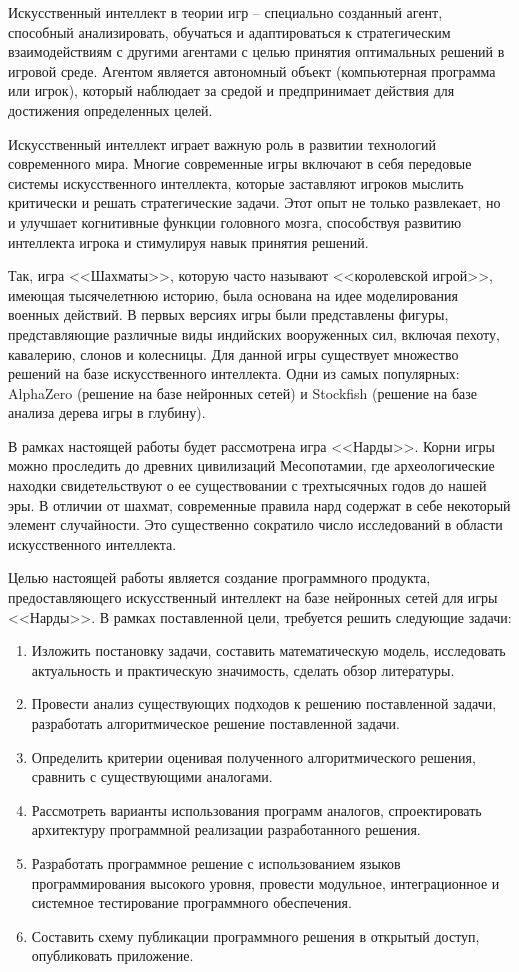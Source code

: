 Искусственный интеллект в теории игр -- специально созданный агент, способный анализировать, обучаться и адаптироваться к стратегическим взаимодействиям с другими агентами с целью принятия оптимальных решений в игровой среде. Агентом является автономный объект (компьютерная программа или игрок), который наблюдает за средой и предпринимает действия для достижения определенных целей.

Искусственный интеллект играет важную роль в развитии технологий современного мира. Многие современные игры включают в себя передовые системы искусственного интеллекта, которые заставляют игроков мыслить критически и решать стратегические задачи. Этот опыт не только развлекает, но и улучшает когнитивные функции головного мозга, способствуя развитию интеллекта игрока и стимулируя навык принятия решений.

Так, игра <<Шахматы>>, которую часто называют <<королевской игрой>>, имеющая тысячелетнюю историю, была основана на идее моделирования военных действий. В первых версиях игры были представлены фигуры, представляющие различные виды индийских вооруженных сил, включая пехоту, кавалерию, слонов и колесницы. Для данной игры существует множество решений на базе искусственного интеллекта. Одни из самых популярных: AlphaZero (решение на базе нейронных сетей) и Stockfish (решение на базе анализа дерева игры в глубину).

В рамках настоящей работы будет рассмотрена игра <<Нарды>>. Корни игры можно проследить до древних цивилизаций Месопотамии, где археологические находки свидетельствуют о ее существовании с трехтысячных годов до нашей эры. В отличии от шахмат, современные правила нард содержат в себе некоторый элемент случайности. Это существенно сократило число исследований в области искусственного интеллекта.

Целью настоящей работы является создание программного продукта, предоставляющего искусственный интеллект на базе нейронных сетей для игры <<Нарды>>. В рамках поставленной цели, требуется решить следующие задачи:
\begin{enumerate}
    \item Изложить постановку задачи, составить математическую модель, исследовать актуальность и практическую значимость, сделать обзор литературы.
    \item Провести анализ существующих подходов к решению поставленной задачи, разработать алгоритмическое решение поставленной задачи.
    \item Определить критерии оценивая полученного алгоритмического решения, сравнить с существующими аналогами.
    \item Рассмотреть варианты использования программ аналогов, спроектировать архитектуру программной реализации разработанного решения.
    \item Разработать программное решение с использованием языков программирования высокого уровня, провести модульное, интеграционное и системное тестирование программного обеспечения.
    \item Составить схему публикации программного решения в открытый доступ, опубликовать приложение.
\end{enumerate}
